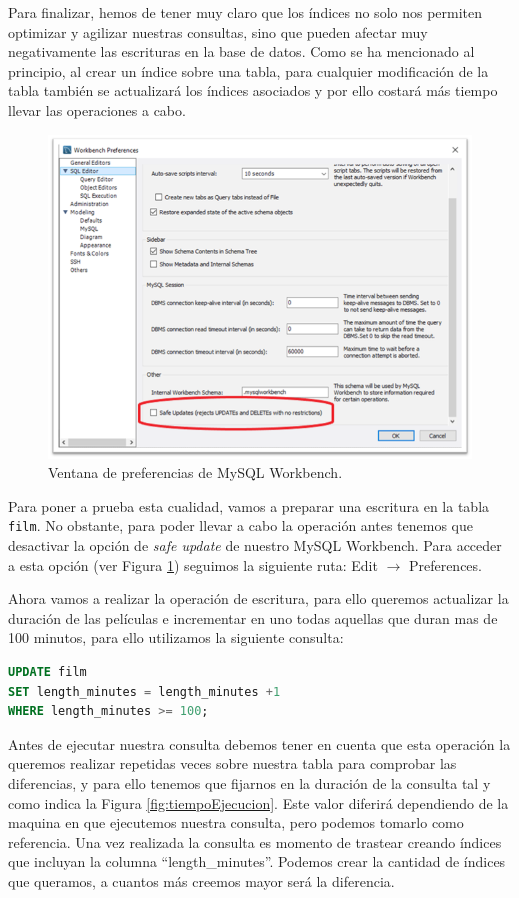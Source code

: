 \documentclass[a4paper]{article}
\begin{document}
Para finalizar, hemos de tener muy claro que los índices no solo nos permiten optimizar y agilizar nuestras consultas, sino que pueden afectar muy negativamente las escrituras en la base de datos. Como se ha mencionado al principio, al crear un índice sobre una tabla, para cualquier modificación de la tabla también se actualizará los índices asociados y por ello costará más tiempo llevar las operaciones a cabo.

\begin{figure}[ht]
    \centering
    \includegraphics[width=0.6\columnwidth]{figs/WorkbenchPreferences.png}
    \caption{Ventana de preferencias de MySQL Workbench.}\label{fig:preferences}
\end{figure}

Para poner a prueba esta cualidad, vamos a preparar una escritura en la tabla \texttt{film}. No obstante, para poder llevar a cabo la operación antes tenemos que desactivar la opción de \emph{safe update} de nuestro MySQL Workbench. Para acceder a esta opción (ver Figura \ref{fig:preferences}) seguimos la siguiente ruta: Edit $\rightarrow$ Preferences.

Ahora vamos a realizar la operación de escritura, para ello queremos actualizar la duración de las películas e incrementar en uno todas aquellas que duran mas de 100 minutos, para ello utilizamos la siguiente consulta:

\newpage

\begin{lstlisting}[language=SQL]
UPDATE film
SET length_minutes = length_minutes +1 
WHERE length_minutes >= 100;
\end{lstlisting}

Antes de ejecutar nuestra consulta debemos tener en cuenta que esta operación la queremos realizar repetidas veces sobre nuestra tabla para comprobar las diferencias, y para ello tenemos que fijarnos en la duración de la consulta tal y como indica la Figura \ref{fig:tiempoEjecucion}. Este valor diferirá dependiendo de la maquina en que ejecutemos nuestra consulta, pero podemos tomarlo como referencia. Una vez realizada la consulta es momento de trastear creando índices que incluyan la columna ``length\_minutes''. Podemos crear la cantidad de índices que queramos, a cuantos más creemos mayor será la diferencia. 
\end{document}
